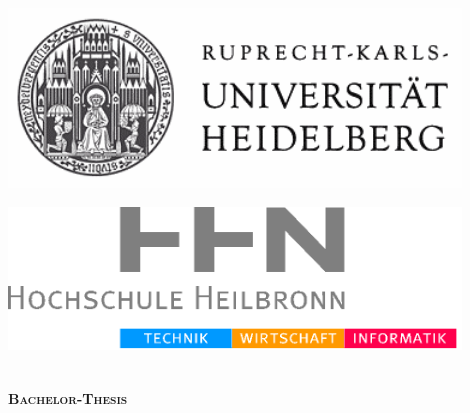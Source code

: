 
\begin{center}
\hfill
\begin{minipage}{0.45\textwidth}
\begin{flushleft}
\includegraphics[width=0.9\textwidth]{00_title/pics/UniHD} \\
\end{flushleft}
\end{minipage}
\hfill
\begin{minipage}{0.45\textwidth}
\begin{flushright}
\includegraphics[width=0.9\textwidth]{00_title/pics/HHN} \\
\end{flushright}
\end{minipage}
\hfill \\[3.0cm]

\textsc{\huge \bfseries Bachelor-Thesis}\\[1.0cm]

{ \Large \bfseries \titel}\\[6.5cm]


\end{center}
